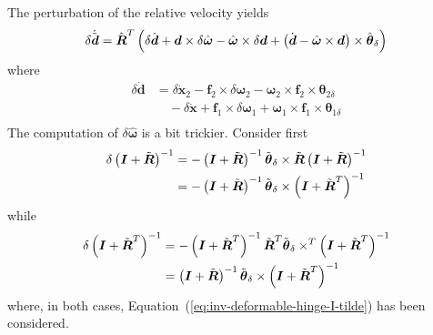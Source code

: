 \documentclass[10pt,dvips,fleqn]{report}
\newcommand{\T}[1]{\boldsymbol{#1}}
\newcommand{\TT}[1]{\boldsymbol{#1}}
\begin{document}
The perturbation of the relative velocity yields
\begin{equation}
	\delta\dot{\tilde{\T{d}}} = \hat{\TT{R}}^T \plbr{
		\delta\dot{\T{d}}
		+ \T{d} \times \delta\hat{\T{\omega}}
		- \hat{\T{\omega}} \times \delta\T{d}
		+ \plbr{\dot{\T{d}} - \hat{\T{\omega}} \times \T{d}} \times \hat{\T{\theta}}_{\delta}
	}
\end{equation}
where
\begin{align}
	\delta\dot{\T{d}}
	&= \delta\dot{\T{x}}_2
		- \T{f}_2 \times \delta\T{\omega}_{2}
		- \T{\omega}_{2} \times \T{f}_2 \times \T{\theta}_{2\delta}
			\nonumber \\
		& \quad - \delta\dot{\T{x}}
		+ \T{f}_1 \times \delta\T{\omega}_{1}
		+ \T{\omega}_{1} \times \T{f}_1 \times \T{\theta}_{1\delta} \\
\end{align}
The computation of $\delta\hat{\T{\omega}}$ is a bit trickier.
Consider first
\begin{align}
	\delta\plbr{\T{I} + \tilde{\T{R}}}^{-1}
		&= - \plbr{\T{I} + \tilde{\T{R}}}^{-1}
			\tilde{\T{\theta}}_{\delta} \times \tilde{\T{R}}
			\plbr{\T{I} + \tilde{\T{R}}}^{-1} \\
		&= - \plbr{\T{I} + \tilde{\T{R}}}^{-1}
			\tilde{\T{\theta}}_{\delta} \times
			\plbr{\T{I} + \tilde{\T{R}}^T}^{-1}
\end{align}
while
\begin{align}
	\delta\plbr{\T{I} + \tilde{\T{R}}^T}^{-1}
		&= - \plbr{\T{I} + \tilde{\T{R}}^T}^{-1}
			\tilde{\T{R}}^T \tilde{\T{\theta}}_{\delta} \times^T
			\plbr{\T{I} + \tilde{\T{R}}^T}^{-1} \\
		&= \plbr{\T{I} + \tilde{\T{R}}}^{-1}
			\tilde{\T{\theta}}_{\delta} \times
			\plbr{\T{I} + \tilde{\T{R}}^T}^{-1}
\end{align}
where, in both cases, Equation~(\ref{eq:inv-deformable-hinge-I-tilde})
has been considered.
\end{document}
